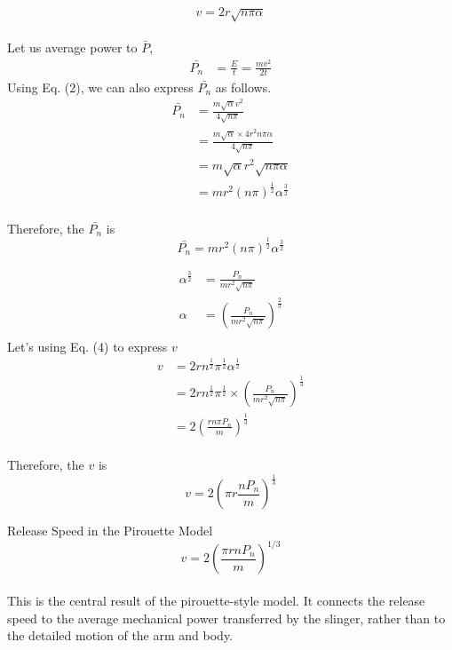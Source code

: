 \documentclass[11pt,letterpaper]{article}
\begin{document}
\begin{equation}
v = 2r\sqrt{n\pi\alpha}
\end{equation}
\\
Let us average power to $\bar{P}$,
\begin{align*}
\bar{P_n}&=\frac{E}{t}=\frac{mv^2}{2t}
\end{align*}
Using Eq. (2), we can also express $\bar{P_n}$ as follows.\\
\begin{align*}
\bar{P_n}
&=\frac{m\sqrt{\alpha}v^2}{4\sqrt{n\pi}}\\[0.5em]
&=\frac{m\sqrt{\alpha}\times 4r^2 n\pi\alpha}{4\sqrt{n\pi}}\\[0.5em]
&=m\sqrt{\alpha}r^2\sqrt{n\pi\alpha}\\[0.5em]
&=mr^2(n\pi)^\frac{1}{2} \alpha ^\frac{3}{2}
\end{align*}
\\
Therefore, the $\bar{P_n}$ is
\begin{equation}
\bar{P_n}=mr^2(n\pi)^\frac{1}{2} \alpha ^\frac{3}{2}
\end{equation}

\begin{align*}
\alpha ^\frac{3}{2} &= \frac{P_n}{mr^2\sqrt{{n\pi}}}\\[0.5em]
\alpha &= (\frac{P_n}{mr^2\sqrt{n\pi}})^\frac{2}{3}\\[0.5em]
\end{align*}
Let's using Eq. (4) to express $v$
\begin{align*}
v &= 2rn^\frac{1}{2}\pi^\frac{1}{2}\alpha^\frac{1}{2}\\
&= 2rn^\frac{1}{2}\pi^\frac{1}{2}\times(\frac{P_n}{mr^2\sqrt{n\pi}})^\frac{1}{3}\\[0.5em]
&= 2(\frac{rn\pi P_n}{m})^\frac{1}{3}
\end{align*}
\\
Therefore, the $v$ is
\begin{equation*}
v = 2(\pi r \frac{nP_n}{m})^\frac{1}{3}
\end{equation*}
\begin{equationbreakdown}{Release Speed in the Pirouette Model}
\begin{equation*}
v = 2\left(\frac{\pi r n P_n}{m}\right)^{1/3}
\end{equation*}
\\
This is the central result of the pirouette-style model. It connects
the release speed to the average mechanical power transferred by the
slinger, rather than to the detailed motion of the arm and body.
\end{equationbreakdown}
\end{document}
